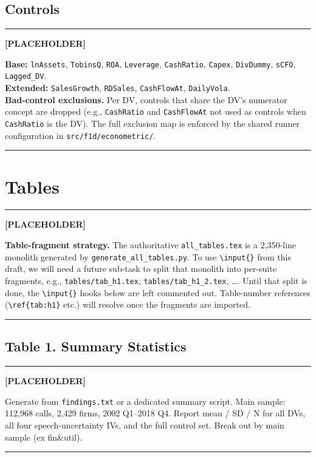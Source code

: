 \documentclass[11pt,a4paper,twocolumn]{article}
\newenvironment{placeholder}{%
  \par\medskip\noindent%
  {\color{placeholderaccent}\rule{\linewidth}{0.4pt}}\par%
  \noindent\textbf{\color{placeholderaccent}[PLACEHOLDER]}\par%
  \smallskip\itshape%
}{%
  \par\upshape\smallskip%
  {\color{placeholderaccent}\rule{\linewidth}{0.4pt}}\par\medskip%
}
\begin{document}
\subsection{Controls}
\label{app:vardef_controls}
\begin{placeholder}
\textbf{Base:} \texttt{lnAssets}, \texttt{TobinsQ}, \texttt{ROA},
\texttt{Leverage}, \texttt{CashRatio}, \texttt{Capex},
\texttt{DivDummy}, \texttt{sCFO}, \texttt{Lagged\_DV}.\\
\textbf{Extended:} \texttt{SalesGrowth}, \texttt{RDSales},
\texttt{CashFlowAt}, \texttt{DailyVola}.\\
\textbf{Bad-control exclusions.} Per DV, controls that share the
DV's numerator concept are dropped (e.g., \texttt{CashRatio} and
\texttt{CashFlowAt} not used as controls when \texttt{CashRatio}
is the DV). The full exclusion map is enforced by the shared
runner configuration in \texttt{src/f1d/econometric/}.
\end{placeholder}

\clearpage

\section{Tables}
\label{app:tables}

\begin{placeholder}
\textbf{Table-fragment strategy.} The authoritative
\texttt{all\_tables.tex} is a 2{,}350-line monolith generated by
\texttt{generate\_all\_tables.py}. To use \texttt{\textbackslash input\{\}}
from this draft, we will need a future sub-task to split that
monolith into per-suite fragments, e.g., \texttt{tables/tab\_h1.tex},
\texttt{tables/tab\_h1\_2.tex}, \ldots. Until that split is done,
the \texttt{\textbackslash input\{\}} hooks below are left commented
out. Table-number references (\texttt{\textbackslash ref\{tab:h1\}}
etc.) will resolve once the fragments are imported.
\end{placeholder}

\subsection*{Table 1. Summary Statistics}
\begin{placeholder}
Generate from \texttt{findings.txt} or a dedicated summary script.
Main sample: 112{,}968 calls, 2{,}429 firms, 2002 Q1--2018 Q4.
Report mean / SD / N for all DVs, all four speech-uncertainty IVs,
and the full control set. Break out by main sample (ex fin\&util).
\end{placeholder}
\end{document}

